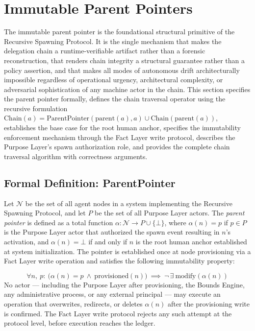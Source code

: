 \section{Immutable Parent Pointers}
\label{sec:immutable-parent-pointers}

The immutable parent pointer is the foundational structural primitive of the Recursive Spawning Protocol. It is the single mechanism that makes the delegation chain a runtime-verifiable artifact rather than a forensic reconstruction, that renders chain integrity a structural guarantee rather than a policy assertion, and that makes all modes of autonomous drift architecturally impossible regardless of operational urgency, architectural complexity, or adversarial sophistication of any machine actor in the chain. This section specifies the parent pointer formally, defines the chain traversal operator using the recursive formulation $\mathrm{Chain}(a) = \mathrm{ParentPointer}(\mathrm{parent}(a), a) \cup \mathrm{Chain}(\mathrm{parent}(a))$, establishes the base case for the root human anchor, specifies the immutability enforcement mechanism through the Fact Layer write protocol, describes the Purpose Layer's spawn authorization role, and provides the complete chain traversal algorithm with correctness arguments.

\subsection{Formal Definition: ParentPointer}
\label{sec:parent-pointer-definition}

Let $\mathcal{N}$ be the set of all agent nodes in a \bxthree{} system implementing the Recursive Spawning Protocol, and let $P$ be the set of all Purpose Layer actors. The \emph{parent pointer} is defined as a total function $\alpha : \mathcal{N} \rightarrow P \cup \{\bot\}$, where $\alpha(n) = p$ if $p \in P$ is the Purpose Layer actor that authorized the spawn event resulting in $n$'s activation, and $\alpha(n) = \bot$ if and only if $n$ is the root human anchor established at system initialization. The pointer is established once at node provisioning via a Fact Layer write operation and satisfies the following immutability property:

\begin{dfn}
\label{dfn:parent-pointer}
\begin{equation}
\forall n,\ p:\ \bigl(\alpha(n) = p \ \land \ \mathrm{provisioned}(n)\bigr) \ \implies \ \neg\,\exists\ \mathrm{modify}(\alpha(n))
\label{eq:parent-pointer-immutability}
\end{equation}
No actor --- including the Purpose Layer after provisioning, the Bounds Engine, any administrative process, or any external principal --- may execute an operation that overwrites, redirects, or deletes $\alpha(n)$ after the provisioning write is confirmed. The Fact Layer write protocol rejects any such attempt at the protocol level, before execution reaches the ledger.
\end{dfn}

